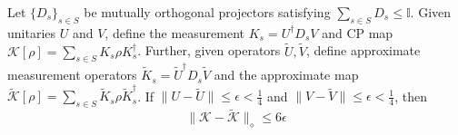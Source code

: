 \begin{lemma*}[\ref{lemma:3}]
Let $\{D_s\}_{s\in S}$ be mutually orthogonal projectors satisfying $\sum_{s\in S} D_s \leq \mathbb{I}$. Given unitaries $U$ and $V$, define the measurement $K_s = U^{\dagger}D_s V$ and CP map $\mathcal{K}[\rho] = \sum_{s \in S} K_s\rho K_s^{\dagger}$. Further, given operators $\tilde U, \tilde V$, define approximate measurement operators $\tilde K_s = \tilde U^{\dagger}D_s \tilde V$ and the approximate map $\tilde{\mathcal{K}}[\rho] = \sum_{s \in S} \tilde K_s\rho \tilde K_s^{\dagger}$. If $\|U-\tilde U\| \leq \epsilon<\frac14$ and $\|V-\tilde V\| \leq \epsilon<\frac14$, then 
\begin{equation}
    \|\mathcal{K} - \tilde{\mathcal{K}}\|_{\diamond} \leq 6\epsilon
\end{equation}
\end{lemma*}
